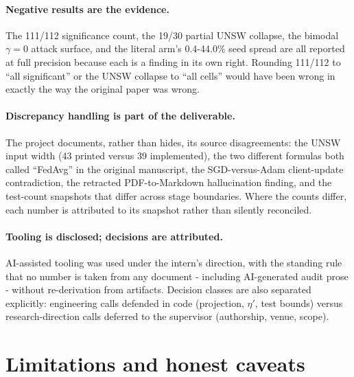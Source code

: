 \documentclass[11pt,a4paper]{report}
\begin{document}
\paragraph{Negative results are the evidence.} The 111/112 significance
count, the 19/30 partial UNSW collapse, the bimodal $\gamma = 0$ attack
surface, and the literal arm's 0.4-44.0\% seed spread are all reported at
full precision because each is a finding in its own right. Rounding
111/112 to ``all significant'' or the UNSW collapse to ``all cells'' would
have been wrong in exactly the way the original paper was wrong.

\paragraph{Discrepancy handling is part of the deliverable.} The project
documents, rather than hides, its source disagreements: the UNSW input
width (43 printed versus 39 implemented), the two different formulas both
called ``FedAvg'' in the original manuscript, the SGD-versus-Adam
client-update contradiction, the retracted PDF-to-Markdown hallucination
finding, and the test-count snapshots that differ across stage boundaries.
Where the counts differ, each number is attributed to its snapshot rather
than silently reconciled.

\paragraph{Tooling is disclosed; decisions are attributed.} AI-assisted
tooling was used under the intern's direction, with the standing rule that
no number is taken from any document - including AI-generated audit prose -
without re-derivation from artifacts. Decision classes are also separated
explicitly: engineering calls defended in code (projection, $\eta'$, test
bounds) versus research-direction calls deferred to the supervisor
(authorship, venue, scope).

\section{Limitations and honest caveats}
\label{sec:limitations}
\end{document}
